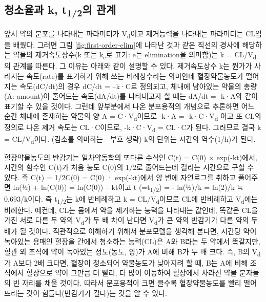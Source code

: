 \documentclass[
  11pt,
  krantz2, a4paper, twoside]{krantz}
\theoremstyle{definition}
\theoremstyle{definition}
\theoremstyle{definition}
\theoremstyle{definition}
\theoremstyle{remark}
\begin{document}
\hypertarget{uxccaduxc18cuxc728uxacfc-k-t12uxc758-uxad00uxacc4}{%
\subsection{\texorpdfstring{청소율과 k, t\textsubscript{1/2}의 관계}{청소율과 k, t1/2의 관계}}\label{uxccaduxc18cuxc728uxacfc-k-t12uxc758-uxad00uxacc4}}

앞서 약의 분포를 나타내는 파라미터가 V\textsubscript{d}이고 제거능력을 나타내는 파라미터는 CL임을 배웠다.
그러면 그림 \ref{fig:first-order-elim}에 나타난 것과 같은 직선의 경사에 해당하는 약물의 제거속도상수(k 또는 k\textsubscript{e}로 표기: e는 elimination을 의미함)는 k = CL/V\textsubscript{d}의 관계를 따른다.
그 이유는 아래와 같이 설명할 수 있다.
제거속도상수 k는 뭔가가 사라지는 속도(rate)를 표기하기 위해 쓰는 비례상수라는 의미인데 혈장약물농도가 떨어지는 속도(dC/dt)의 경우 dC/dt = --k·C로 정의되고, 체내에 남아있는 약물의 총량(A: amount)이 줄어드는 속도(dA/dt)를 나타내고자 할 때는 dA/dt = -k·A와 같이 표기할 수 있을 것이다. 그런데 앞부분에서 나온 분포용적의 개념으로 추론하면 어느 순간 체내에 존재하는 약물의 양 A = C·V\textsubscript{d}이므로 -k·A = -k·C·V\textsubscript{d} 이고 또 CL의 정의로 나온 제거 속도는 CL·C이므로, -k·C·V\textsubscript{d} = CL·C가 된다. 
그러므로 결국 k = CL/V\textsubscript{d}이다. (감소를 의미하는 - 부호 생략) k의 단위는 시간의 역수(1/h)가 된다.

혈장약물농도의 반감기는 일차약동학의 또다른 수식인 C(t) = C(0) × exp(-kt)에서, 시간의 함수인 C(t)가 처음 농도 C(0)의 1/2로 줄어드는데 걸리는 시간으로 구할 수 있다. 
즉 C(t) = 1/2C(0) = C(0) · exp(-kt)에서 양 변에 자연로그를 취하고 풀어주면 ln(½) + ln(C(0)) = ln(C(0)) -- kt이고 t (=t\textsubscript{1/2}) = - ln(½)/k = ln(2)/k ≒ 0.693/k이다.
즉 t\textsubscript{1/2}는 k에 반비례하고 k = CL/V\textsubscript{d}이므로 CL에 반비례하고 V\textsubscript{d}에는 비례한다.
예컨데, CL는 몸에서 약을 제거하는 능력을 나타내는 값인데, 똑같은 CL을 가진 서로 다른 두 약의 V\textsubscript{d}가 두 배 차이 난다면 V\textsubscript{d}가 큰 약의 반감기가 다른 약의 두 배가 될 것이다. 
직관적으로 이해하기 위해서 분포모델을 생각해 본다면, 시간당 약이 녹아있는 용매인 혈장을 간에서 청소하는 능력(CL)은 A와 B라는 두 약에서 똑같지만, 혈관 외 조직에 약이 녹아있는 정도(농도, 양)가 A에 비해 B가 두 배 크다. 즉, B의 V\textsubscript{d}가 A보다 2배 크다면, 혈장이 청소되어 약물농도가 낮아지려 할 때, B는 A에 비해 조직에서 혈장으로 약이 그만큼 더 빨리, 더 많이 이동하여 혈장에서 사라진 약물 분자들의 빈 자리를 채울 것이다.
따라서 분포용적이 크면 클수록 혈장약물농도를 빨리 떨어뜨리는 것이 힘들다(반감기가 길다)는 것을 알 수 있다.
\end{document}
